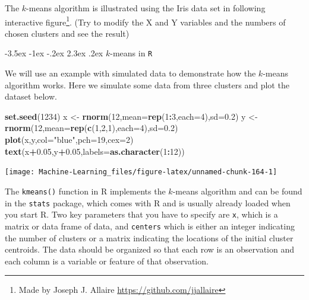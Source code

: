 \documentclass[]{book}
\makeatletter
\newenvironment{Shaded}{\begin{snugshade}}{\end{snugshade}}
\newcommand{\KeywordTok}[1]{\textcolor[rgb]{0.13,0.29,0.53}{\textbf{#1}}}
\newcommand{\DataTypeTok}[1]{\textcolor[rgb]{0.13,0.29,0.53}{#1}}
\newcommand{\DecValTok}[1]{\textcolor[rgb]{0.00,0.00,0.81}{#1}}
\newcommand{\FloatTok}[1]{\textcolor[rgb]{0.00,0.00,0.81}{#1}}
\newcommand{\StringTok}[1]{\textcolor[rgb]{0.31,0.60,0.02}{#1}}
\newcommand{\OperatorTok}[1]{\textcolor[rgb]{0.81,0.36,0.00}{\textbf{#1}}}
\newcommand{\NormalTok}[1]{#1}
\let\rmarkdownfootnote\footnote%
\def\footnote{\protect\rmarkdownfootnote}
\let\origfigure\figure
\let\endorigfigure\endfigure
\renewenvironment{figure}[1][2] {
    \expandafter\origfigure\expandafter[H]
} {
    \endorigfigure
}
\renewcommand\section{\@startsection {section}{1}{\z@}%
                                   {-3.5ex \@plus -1ex \@minus -.2ex}%
                                   {2.3ex \@plus.2ex}%
                                   {\normalfont\Large\bfseries\color{ForestGreen}}}
\theoremstyle{definition}
\theoremstyle{definition}
\theoremstyle{definition}
\theoremstyle{remark}
\makeatother
\begin{document}
The \(k\)-means algorithm is illustrated using the Iris data set in
following interactive figure\footnote{Made by Joseph J. Allaire
  \url{https://github.com/jjallaire}}. (Try to modify the X and Y
variables and the numbers of chosen clusters and see the result)

\section{\texorpdfstring{\(k\)-means in
\texttt{R}}{k-means in R}}\label{k-means-in-r}

We will use an example with simulated data to demonstrate how the
\(k\)-means algorithm works. Here we simulate some data from three
clusters and plot the dataset below.

\begin{Shaded}
\begin{Highlighting}[]
\KeywordTok{set.seed}\NormalTok{(}\DecValTok{1234}\NormalTok{)}
\NormalTok{x <-}\StringTok{ }\KeywordTok{rnorm}\NormalTok{(}\DecValTok{12}\NormalTok{,}\DataTypeTok{mean=}\KeywordTok{rep}\NormalTok{(}\DecValTok{1}\OperatorTok{:}\DecValTok{3}\NormalTok{,}\DataTypeTok{each=}\DecValTok{4}\NormalTok{),}\DataTypeTok{sd=}\FloatTok{0.2}\NormalTok{)}
\NormalTok{y <-}\StringTok{ }\KeywordTok{rnorm}\NormalTok{(}\DecValTok{12}\NormalTok{,}\DataTypeTok{mean=}\KeywordTok{rep}\NormalTok{(}\KeywordTok{c}\NormalTok{(}\DecValTok{1}\NormalTok{,}\DecValTok{2}\NormalTok{,}\DecValTok{1}\NormalTok{),}\DataTypeTok{each=}\DecValTok{4}\NormalTok{),}\DataTypeTok{sd=}\FloatTok{0.2}\NormalTok{)}
\KeywordTok{plot}\NormalTok{(x,y,}\DataTypeTok{col=}\StringTok{"blue"}\NormalTok{,}\DataTypeTok{pch=}\DecValTok{19}\NormalTok{,}\DataTypeTok{cex=}\DecValTok{2}\NormalTok{)}
\KeywordTok{text}\NormalTok{(x}\OperatorTok{+}\FloatTok{0.05}\NormalTok{,y}\OperatorTok{+}\FloatTok{0.05}\NormalTok{,}\DataTypeTok{labels=}\KeywordTok{as.character}\NormalTok{(}\DecValTok{1}\OperatorTok{:}\DecValTok{12}\NormalTok{))}
\end{Highlighting}
\end{Shaded}

\begin{figure}

{\centering \texttt{[image: Machine-Learning\_files/figure-latex/unnamed-chunk-164-1]} 

}

\caption{Simulated dataset}\label{fig:unnamed-chunk-164}
\end{figure}

The \texttt{kmeans()} function in R implements the \(k\)-means algorithm
and can be found in the \texttt{stats} package, which comes with R and
is usually already loaded when you start R. Two key parameters that you
have to specify are \texttt{x}, which is a matrix or data frame of data,
and \texttt{centers} which is either an integer indicating the number of
clusters or a matrix indicating the locations of the initial cluster
centroids. The data should be organized so that each row is an
observation and each column is a variable or feature of that
observation.
\end{document}
